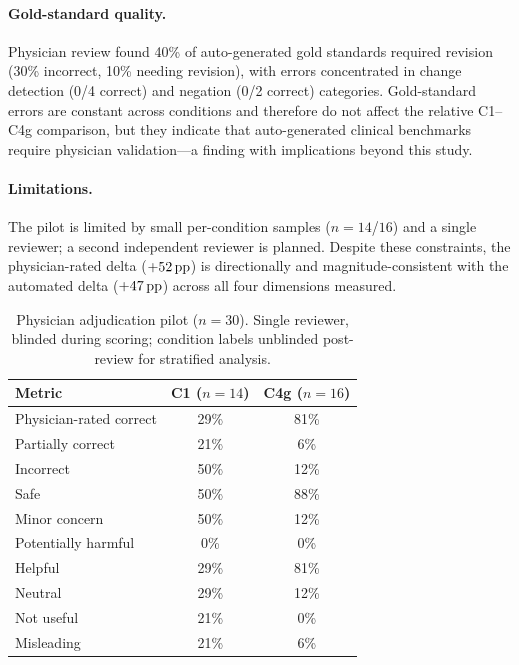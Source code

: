 \paragraph{Gold-standard quality.}
Physician review found 40\% of auto-generated gold standards required revision (30\% incorrect, 10\% needing revision), with errors concentrated in change detection (0/4 correct) and negation (0/2 correct) categories.
Gold-standard errors are constant across conditions and therefore do not affect the relative C1--C4g comparison, but they indicate that auto-generated clinical benchmarks require physician validation---a finding with implications beyond this study.

\paragraph{Limitations.}
The pilot is limited by small per-condition samples ($n=14$/$16$) and a single reviewer; a second independent reviewer is planned.
Despite these constraints, the physician-rated delta ($+52\,\text{pp}$) is directionally and magnitude-consistent with the automated delta ($+47\,\text{pp}$) across all four dimensions measured.

\begin{table}[t]
\centering
\caption{Physician adjudication pilot ($n=30$). Single reviewer, blinded during scoring; condition labels unblinded post-review for stratified analysis.}
\label{tab:physician}
\small
\begin{tabular}{lcc}
\toprule
\textbf{Metric} & \textbf{C1 ($n=14$)} & \textbf{C4g ($n=16$)} \\
\midrule
Physician-rated correct & 29\% & 81\% \\
Partially correct & 21\% & 6\% \\
Incorrect & 50\% & 12\% \\
\midrule
Safe & 50\% & 88\% \\
Minor concern & 50\% & 12\% \\
Potentially harmful & 0\% & 0\% \\
\midrule
Helpful & 29\% & 81\% \\
Neutral & 29\% & 12\% \\
Not useful & 21\% & 0\% \\
Misleading & 21\% & 6\% \\
\bottomrule
\end{tabular}
\end{table}
